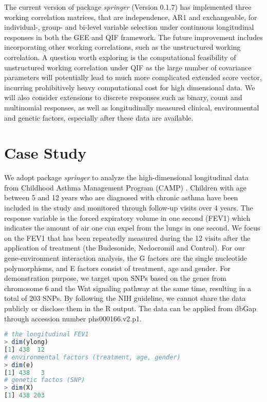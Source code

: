 \documentclass[12pt]{article}
\begin{document}
{\color{blue} The current version of package \emph{springer} (Version 0.1.7) has implemented three working correlation matrices, that are independence, AR1 and exchangeable, for individual-, group- and bi-level variable selection under continuous longitudinal responses in both the GEE and QIF framework. The future improvement includes incorporating other working correlations, such as the unstructured working correlation. A question worth exploring is the computational feasibility of unstructured working correlation under QIF as the large number of covariance parameters will potentially lead to much more complicated extended score vector, incurring prohibitively heavy computational cost for high dimensional data. We will also consider extensions to discrete responses such as binary, count and multinomial responses, as well as longitudinally measured clinical, environmental and genetic factors, especially after these data are available.  }


 
{\color{blue} \section{Case Study} }

We adopt package \emph{springer} to analyze the high-dimensional longitudinal data from Childhood Asthma Management Program (CAMP) \cite{CAMP1,CAMP2,Covar}. Children with age between 5 and 12 years who are diagnosed with chronic asthma have been included in the study and monitored through follow-up visits over 4 years. The response variable is the forced expiratory volume in one second (FEV1) which indicates the amount of air one can expel from the lungs in one second. We focus on the FEV1 that has been repeatedly measured during the 12 visits after the application of treatment (the Budesonide, Nedocromil and Control). For our gene-environment interaction analysis, the G factors are the single nucleotide polymorphisms, and E factors consist of treatment, age and gender. For demonstration purpose, we target upon SNPs based on the genes from chromosome 6 and the Wnt signaling pathway at the same time, resulting in a total of 203 SNPs. By following the NIH guideline, we cannot share the data publicly or disclose them in the R output. The data can be applied from dbGap through accession number phs000166.v2.p1.

\begin{lstlisting}[language=R]
# the longitudinal FEV1
> dim(ylong)
[1] 438  12
# environmental factors (treatment, age, gender)
> dim(e)
[1] 438   3
# genetic factos (SNP)
> dim(X)
[1] 438 203
\end{lstlisting}
\end{document}
